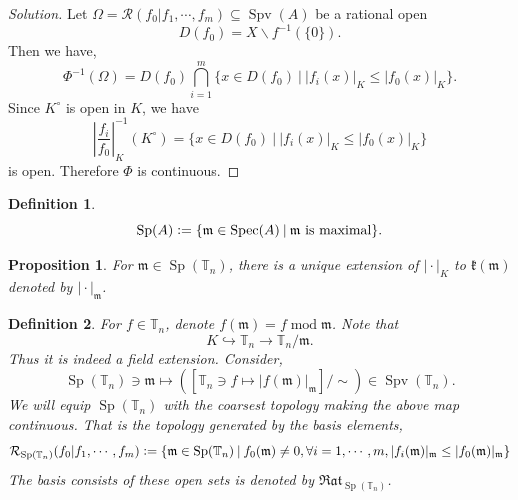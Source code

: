 \documentclass[8pt]{article}
\numberwithin{equation}{section}
\newenvironment{solution}{\begin{proof}[Solution]}{\end{proof}}
\newtheorem{proposition}{Proposition}[section]
\newtheorem{definition}{Definition}[section]
\DeclareMathOperator{\tmod}{mod}
\DeclareMathOperator{\Sp}{Sp}
\DeclareMathOperator{\Spec}{Spec}
\DeclareMathOperator{\Spv}{Spv}
\newcommand{\defeq}{\vcentcolon=}
\newcommand{\m}[0]{\mathfrak{m}}
\newcommand{\T}[0]{\mathbb{T}}
\newcommand{\cR}[0]{\mathcal{R}}
\newcommand{\sep}[0]{\:|\:}
\newcommand{\ab}[1]{\vert #1 \vert}
\newcommand{\Rat}[0]{\mathfrak{Rat}}
\begin{document}
\begin{solution}
  Let $\Omega = \cR(f_0|f_1,\cdots,f_m)\subseteq\Spv(A)$ be a rational open
  \begin{equation*}
    D(f_0) = X\backslash f^{-1}(\{0\}).
  \end{equation*}
   Then we have,
  \begin{equation*}
    \Phi^{-1}(\Omega) = D(f_0)\bigcap_{i=1}^m \{x\in D(f_0)\sep \ab{f_i(x)}_K\leq \ab{f_0(x)}_K\}.
  \end{equation*}
  Since $K^\circ$ is open in $K$, we have 
  \begin{equation*}
    \left\vert{\frac {f_i} {f_0}}\right\vert_K^{-1}(K^\circ) = \{x\in D(f_0)\sep \ab{f_i(x)}_K\leq \ab{f_0(x)}_K\}
  \end{equation*}
  is open. Therefore $\Phi$ is continuous.
\end{solution}
\begin{definition}
  \begin{equation*}
    \Sp(A) \defeq\{\m\in\Spec(A)\sep \text{$\m$ is maximal}\}.
  \end{equation*}
\end{definition}
\begin{proposition}
  For $\m\in\Sp(\T_n)$, there is a unique extension of $\ab{\cdot}_K$ to $\mathfrak{k}(\m)$ denoted by $\ab{\cdot}_\m$.
\end{proposition}
\begin{definition}
  For $f\in \T_n$, denote $f(\m) = f\tmod\m$. Note that 
  \begin{equation*}
    K\hookrightarrow \T_n\to \T_n/\m.
  \end{equation*}
  Thus it is indeed a field extension. Consider,
  \begin{equation*}
    \Sp(\T_n)\ni \m\mapsto ([\T_n\ni f\mapsto \ab{f(\m)}_\m]/\sim)\in\Spv(\T_n).
  \end{equation*}
  We will equip $\Sp(\T_n)$ with the coarsest topology making the above map continuous. That is the topology generated by the basis elements,
  \begin{equation*}
    \cR_{\Sp(\T_n)}(f_0|f_1,\cdots,f_m) \defeq\{\m\in\Sp(\T_n)\sep f_0(\m)\not=0,\forall i=1,\cdots,m, \ab{f_i(\m)}_\m\leq\ab{f_0(\m)}_\m\}
  \end{equation*}
  The basis consists of these open sets is denoted by $\Rat_{\Sp(\T_n)}$.
\end{definition}
\end{document}

